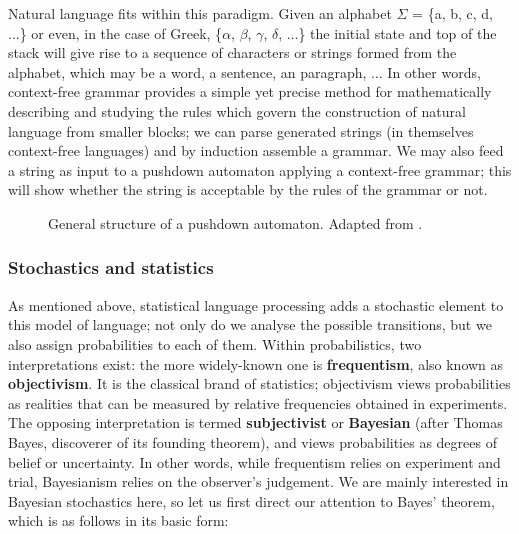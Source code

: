 Natural language fits within this paradigm. Given an alphabet $\Sigma$ = \{a,
b, c, d, ...\} or even, in the case of Greek, \{$\alpha$, $\beta$, $\gamma$,
$\delta$, ...\} the initial state and top of the stack will give rise to a
sequence of characters or strings formed from the alphabet, which may be a
word, a sentence, an paragraph, ... In other words, context-free grammar provides
a simple yet precise method for mathematically describing and studying the
rules which govern the construction of natural language from smaller blocks; we
can parse generated strings (in themselves context-free languages) and by
induction assemble a grammar. We may also feed a string as input to a pushdown
automaton applying a context-free grammar; this will show whether the string is
acceptable by the rules of the grammar or not.

\begin{figure}
  \begin{center}
\end{center}
\caption{General structure of a pushdown automaton. Adapted from \citet[220]{hopcroft2001}.} \label{fig:pushdownautomaton}
\end{figure}

\subsubsection{Stochastics and statistics} %
\label{ssub:stochastics}

As mentioned above, statistical language processing adds a stochastic element
to this model of language; not only do we analyse the possible transitions, but
we also assign probabilities to each of them. Within probabilistics, two
interpretations exist: the more widely-known one is \textbf{frequentism}, also
known as \textbf{objectivism}. It is the classical brand of statistics;
objectivism views probabilities as realities that can be measured by relative
frequencies obtained in experiments. The opposing interpretation is termed
\textbf{subjectivist} or \textbf{Bayesian} (after Thomas Bayes, discoverer of
its founding theorem), and views probabilities as degrees of belief or
uncertainty. In other words, while frequentism relies on experiment and trial,
Bayesianism relies on the observer's judgement. We are mainly interested in
Bayesian stochastics here, so let us first direct our attention to Bayes'
theorem, which is as follows in its basic form:

